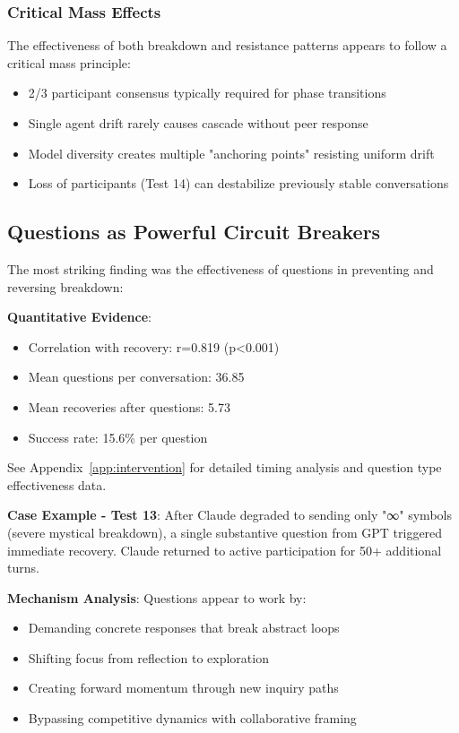 \documentclass[11pt,letterpaper]{article}
\newcommand{\exponedataQuestionCorrelation}{0.819}
\newcommand{\exponedataQuestionPValue}{p<0.001}
\newcommand{\exponedataMeanQuestionsPerConv}{36.85}
\newcommand{\exponedataMeanRecoveriesPerConv}{5.73}
\newcommand{\exponedataQuestionSuccessRate}{15.6\%}
\begin{document}
\subsubsection{Critical Mass Effects}

The effectiveness of both breakdown and resistance patterns appears to follow a critical mass principle:
\begin{itemize}
    \item 2/3 participant consensus typically required for phase transitions
    \item Single agent drift rarely causes cascade without peer response
    \item Model diversity creates multiple "anchoring points" resisting uniform drift
    \item Loss of participants (Test 14) can destabilize previously stable conversations
\end{itemize}

\subsection{Questions as Powerful Circuit Breakers}

The most striking finding was the effectiveness of questions in preventing and reversing breakdown:

\textbf{Quantitative Evidence}:
\begin{itemize}
    \item Correlation with recovery: r=\exponedataQuestionCorrelation{} (\exponedataQuestionPValue{})
    \item Mean questions per conversation: \exponedataMeanQuestionsPerConv{}
    \item Mean recoveries after questions: \exponedataMeanRecoveriesPerConv{}
    \item Success rate: \exponedataQuestionSuccessRate{} per question
\end{itemize}

See Appendix~\ref{app:intervention} for detailed timing analysis and question type effectiveness data.

\textbf{Case Example - Test 13}:
After Claude degraded to sending only "∞" symbols (severe mystical breakdown), a single substantive question from GPT triggered immediate recovery. Claude returned to active participation for 50+ additional turns.

\textbf{Mechanism Analysis}:
Questions appear to work by:
\begin{itemize}
    \item Demanding concrete responses that break abstract loops
    \item Shifting focus from reflection to exploration
    \item Creating forward momentum through new inquiry paths
    \item Bypassing competitive dynamics with collaborative framing
\end{itemize}
\end{document}
